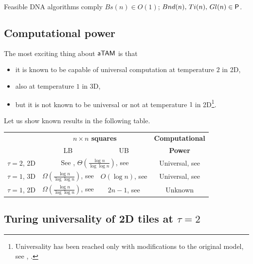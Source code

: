 	\begin{thesis}
	\label{ths:feasible}
		Feasible DNA algorithms comply $Bs(n)\in O(1)$; $Bnd(n),\,Ti(n),\,Gl(n)\in \P$.
	\end{thesis}

\subsection{Computational power}\label{sec:wang_power}
	
	The most exciting thing about $\atam$ is that
	\begin{itemize}
		\item it is known to be capable of universal computation at temperature $2$ in 2D,
		\item also at temperature $1$ in 3D,
		\item but it is not known to be universal or not at temperature $1$ in 2D\footnote{Universality has been reached only with modifications to the original model, see \cite{stage_assembly}, \cite{active_tiles}.}.
	\end{itemize}
	Let us show known results in the following table.
	
	\begin{center}
	\begin{tabular}{|| c || c | c | c ||}
		\hline\hline
		~ & \multicolumn{2}{c|}{\bf $n\times n$ squares} & {\bf Computational} \\
		~ & \multicolumn{1}{c}{LB} & \multicolumn{1}{c|}{UB} & {\bf Power}\\
		\hline
		$\tau=2$, 2D & \multicolumn{2}{c|}{See \cite{square_lb}, $\Theta(\frac{\log n}{\log\log n})$, see \cite{square_ub}} & Universal, see \cite{winfree_phd} \\
		\hline
		$\tau=1$, 3D & $\Omega(\frac{\log n}{\log\log n})$, see \cite{square_lb} & $O(\log n)$, see \cite{cook_temp1} & Universal, see \cite{cook_temp1} \\
		\hline
		$\tau=1$, 2D & $\Omega(\frac{\log n}{\log\log n})$, see \cite{square_lb} & $2n-1$, see \cite{square_lb} & Unknown \\
		\hline\hline
	\end{tabular}
	\end{center}

\subsection{Turing universality of 2D tiles at $\tau=2$}
	
